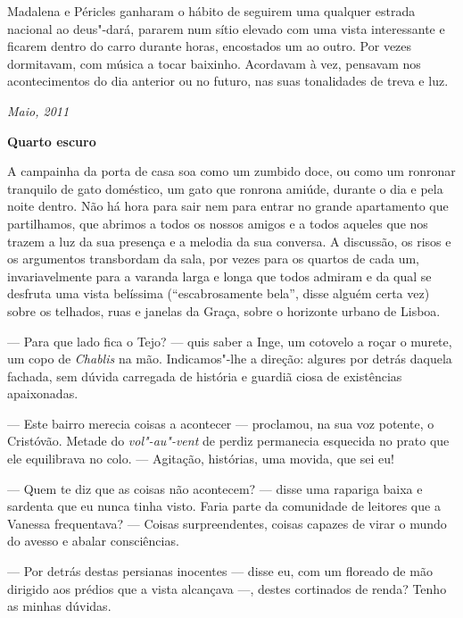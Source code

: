 Madalena e Péricles ganharam o hábito de seguirem uma qualquer estrada
nacional ao deus"-dará, pararem num sítio elevado com uma vista
interessante e ficarem dentro do carro durante horas, encostados um ao
outro. Por vezes dormitavam, com música a tocar baixinho. Acordavam à
vez, pensavam nos acontecimentos do dia anterior ou no futuro, nas suas
tonalidades de treva e luz.

\begin{flushright}
\emph{Maio, 2011}
\end{flushright}
\pagebreak
\thispagestyle{empty}


\movetooddpage\vspace*{1.8cm}
\noindent{}\textbf{Quarto escuro}
\bigskip

A campainha da porta de casa soa como um zumbido doce, ou como um ronronar
tranquilo de gato doméstico, um gato que ronrona amiúde, durante o dia e
pela noite dentro. Não há hora para sair nem para entrar no grande
apartamento que partilhamos, que abrimos a todos os nossos amigos e a
todos aqueles que nos trazem a luz da sua presença e a melodia da sua
conversa. A discussão, os risos e os argumentos transbordam da sala,
por vezes para os quartos de cada um, invariavelmente para a varanda
larga e longa que todos admiram e da qual se desfruta uma vista
belíssima (``escabrosamente bela'', disse alguém certa vez) sobre os
telhados, ruas e janelas da Graça, sobre o horizonte urbano de Lisboa.

--- Para que lado fica o Tejo? --- quis saber a Inge, um cotovelo a roçar
  o murete, um copo de \emph{Chablis }na mão. Indicamos"-lhe a
  direção: algures por detrás daquela fachada, sem dúvida carregada de
  história e guardiã ciosa de existências apaixonadas.

--- Este bairro merecia coisas a acontecer --- proclamou, na sua voz
  potente, o Cristóvão. Metade do \emph{vol"-au"-vent }de perdiz
  permanecia esquecida no prato que ele equilibrava no
colo. --- Agitação, histórias, uma movida, que sei eu!

--- Quem te diz que as coisas não acontecem? --- disse uma rapariga
baixa e sardenta que eu nunca tinha visto. Faria parte da comunidade de
leitores que a Vanessa frequentava? --- Coisas surpreendentes, coisas
capazes de virar o mundo do avesso e abalar consciências.

--- Por detrás destas persianas inocentes --- disse eu, com um floreado
de mão dirigido aos prédios que a vista alcançava ---, destes cortinados
de renda? Tenho as minhas dúvidas.

